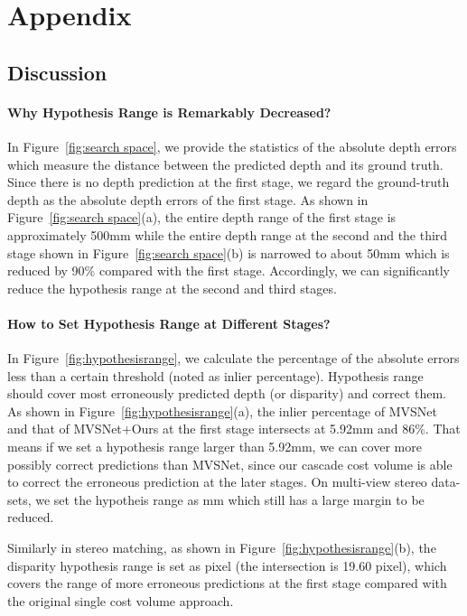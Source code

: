 \documentclass[10pt,twocolumn,letterpaper]{article}
\begin{document}
\section{Appendix}
\subsection{Discussion}


\paragraph{Why Hypothesis Range is Remarkably Decreased?}\label{Why_Hypothesis_Range}
In Figure~\ref{fig:search space}, we provide the statistics of the absolute depth errors which measure the distance between the predicted depth and its ground truth.
Since there is no depth prediction at the first stage, we regard the ground-truth depth as the absolute depth errors of the first stage.
As shown in Figure~\ref{fig:search space}(a), the entire depth range of the first stage is approximately 500mm while the entire depth range at the second and the third stage shown in Figure~\ref{fig:search space}(b) is narrowed to about 50mm which is reduced by 90\% compared with the first stage. Accordingly, we can significantly reduce the hypothesis range at the second and third stages.

\vspace{-3mm}

\paragraph{How to Set Hypothesis Range at Different Stages?}\label{effect_of_hypothesis}
In Figure~\ref{fig:hypothesisrange}, we calculate the percentage of the absolute errors less than a certain threshold (noted as inlier percentage). 
Hypothesis range should cover most erroneously predicted depth (or disparity) and correct them. 
As shown in Figure~\ref{fig:hypothesisrange}(a), the inlier percentage of MVSNet~\cite{yao2018mvsnet} and that of MVSNet+Ours at the first stage intersects at 5.92mm and 86\%. 
That means if we set a hypothesis range larger than 5.92mm, we can cover more possibly correct predictions than MVSNet, since our cascade cost volume is able to correct the erroneous prediction at the later stages.
On multi-view stereo data-sets, we set the hypotheis range as mm which still has a large margin to be reduced.

Similarly in stereo matching, as shown in Figure~\ref{fig:hypothesisrange}(b), the disparity hypothesis range is set as  pixel  (the intersection is 19.60 pixel), which covers the range of more erroneous predictions at the first stage compared with the original single cost volume approach.
 
\end{document}
